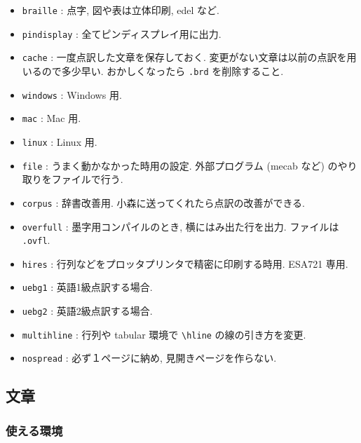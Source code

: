 \documentclass[lualatex,ja=standard,jafont=haranoaji]{bxjsarticle}
\begin{document}
\begin{itemize}
\item \verb|braille| : 点字, 図や表は立体印刷, edel など.
\item \verb|pindisplay| : 全てピンディスプレイ用に出力.
\item \verb|cache| : 一度点訳した文章を保存しておく. 変更がない文章は以前の点訳を用いるので多少早い. おかしくなったら \verb|.brd| を削除すること.
\item \verb|windows| : Windows 用.
\item \verb|mac| : Mac 用.
\item \verb|linux| : Linux 用.
\item \verb|file| : うまく動かなかった時用の設定. 外部プログラム (mecab など) のやり取りをファイルで行う. 
\item \verb|corpus| : 辞書改善用. 小森に送ってくれたら点訳の改善ができる.
\item \verb|overfull| : 墨字用コンパイルのとき, 横にはみ出た行を出力. ファイルは \verb|.ovfl|.
\item \verb|hires| : 行列などをプロッタプリンタで精密に印刷する時用. ESA721 専用.
\item \verb|uebg1| : 英語1級点訳する場合. 
\item \verb|uebg2| : 英語2級点訳する場合. 
\item \verb|multihline| : 行列や tabular 環境で \verb|\hline| の線の引き方を変更.
\item \verb|nospread| : 必ず１ページに納め, 見開きページを作らない.
\end{itemize}

\subsection{文章}
\subsubsection{使える環境}
\end{document}
